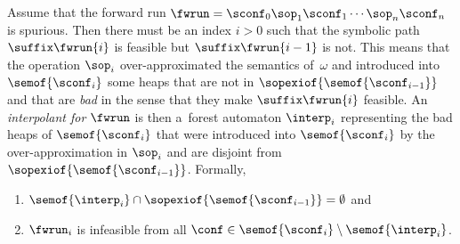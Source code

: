 %
Assume that the forward run $\fwrun = \sconf_0\sop_1\sconf_1\cdots\sop_n\sconf_n$ is spurious. 
Then there must be an index $i>0$ 
such that the symbolic path $\suffix \fwrun {i}$ is feasible 
but $\suffix \fwrun {i-1}$ is not.
This means that the operation $\sop_i$  over-approximated the semantics of~$\omega$ and 
introduced into~$\semof{\sconf_{i}}$ some heaps that are not in $\sopexiof{\semof{\sconf_{i-1}}}$ 
and that are \emph{bad} in the sense that they make $\suffix \fwrun {i}$ feasible.
%
An \emph{interpolant for $\fwrun$}
is then a~forest automaton $\interp_i$ representing
the bad heaps
of $\semof{\sconf_i}$ that were introduced into $\semof{\sconf_{i}}$ by the
over-approximation in $\sop_i$ and are
disjoint from $\sopexiof{\semof{\sconf_{i-1}}}$.
Formally,
%
\begin{enumerate}
\item
$\semof{\interp_i} \cap \sopexiof{\semof{\sconf_{i-1}}} = \emptyset$ and 
\item
$\fwrun_i$ is infeasible from all $\conf\in\semof{\sconf_i} \setminus \semof{\interp_i}$.
\end{enumerate}
%
%


